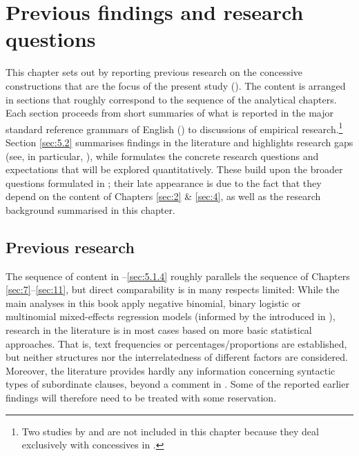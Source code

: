 \chapter{\label{bkm:Ref466898909}\label{bkm:Ref3457867}Previous findings and research questions}\label{sec:5}

This chapter sets out by reporting previous research on the concessive constructions that are the focus of the present study (). The content is arranged in sections that roughly correspond to the sequence of the analytical chapters. Each section proceeds from short summaries of what is reported in the major standard reference grammars of English (\citealt{QuirkEtAl1985,BiberEtAl1999,HuddlestonPullum2002}) to discussions of empirical research.\footnote{Two studies by \citet{Burnham1911} and \citet{Quirk1954} are not included in this chapter because they deal exclusively with concessives in .} Section \ref{sec:5.2} summarises findings in the literature and highlights research gaps (see, in particular, ), while  formulates the concrete research questions and expectations that will be explored quantitatively. These build upon the broader questions formulated in ; their late appearance is due to the fact that they depend on the content of Chapters \ref{sec:2} \& \ref{sec:4}, as well as the research background summarised in this chapter.

\section{\label{bkm:Ref74132044}Previous research}\label{sec:5.1}

The sequence of content in –\ref{sec:5.1.4} roughly parallels the sequence of Chapters \ref{sec:7}–\ref{sec:11}, but direct comparability is in many respects limited: While the main analyses in this book apply negative binomial, binary logistic or multinomial mixed-effects regression models (informed by the  introduced in ), research in the literature is in most cases based on more basic statistical approaches. That is, text frequencies or percentages/proportions are established, but neither  structures nor the interrelatedness of different factors are considered. Moreover, the literature provides hardly any information concerning syntactic types of subordinate clauses, beyond a comment in \citet{HuddlestonPullum2002}. Some of the reported earlier findings will therefore need to be treated with some reservation.

